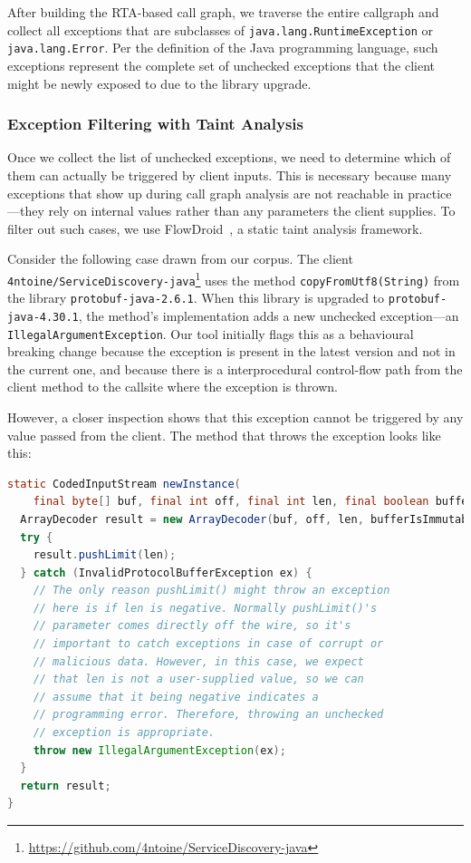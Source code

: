 After building the RTA-based call graph, we traverse the entire callgraph and collect all exceptions that are subclasses of \texttt{java.lang.RuntimeException} or \texttt{java.lang.Error}. Per the definition of the Java programming language, such exceptions represent the complete set of unchecked exceptions that the client might be newly exposed to due to the library upgrade.

\subsubsection{Exception Filtering with Taint Analysis}

Once we collect the list of unchecked exceptions, we need to determine which of them can actually be triggered by client inputs. This is necessary because many exceptions that show up during call graph analysis are not reachable in practice—they rely on internal values rather than any parameters the client supplies. To filter out such cases, we use FlowDroid~\cite{Arzt14:_flowdroid}, a static taint analysis framework.

Consider the following case drawn from our corpus. The client \texttt{4ntoine/ServiceDiscovery-java}\footnote{\url{https://github.com/4ntoine/ServiceDiscovery-java}} uses the method \texttt{copyFromUtf8(String)} from the library \texttt{protobuf-java-2.6.1}. When this library is upgraded to \texttt{protobuf-java-4.30.1}, the method's implementation adds a new unchecked exception—an \texttt{IllegalArgumentException}. Our tool initially flags this as a behavioural breaking change because the exception is present in the latest version and not in the current one, and because there is a interprocedural control-flow path from the client method to the callsite where the exception is thrown.

However, a closer inspection shows that this exception cannot be triggered by any value passed from the client. The method that throws the exception looks like this:

\begin{lstlisting}[language=Java,breaklines=true,basicstyle=\scriptsize\ttfamily]
static CodedInputStream newInstance(
    final byte[] buf, final int off, final int len, final boolean bufferIsImmutable) {
  ArrayDecoder result = new ArrayDecoder(buf, off, len, bufferIsImmutable);
  try {
    result.pushLimit(len);
  } catch (InvalidProtocolBufferException ex) {
    // The only reason pushLimit() might throw an exception
    // here is if len is negative. Normally pushLimit()'s
    // parameter comes directly off the wire, so it's 
    // important to catch exceptions in case of corrupt or
    // malicious data. However, in this case, we expect 
    // that len is not a user-supplied value, so we can 
    // assume that it being negative indicates a 
    // programming error. Therefore, throwing an unchecked 
    // exception is appropriate.
    throw new IllegalArgumentException(ex);
  }
  return result;
}
\end{lstlisting}

